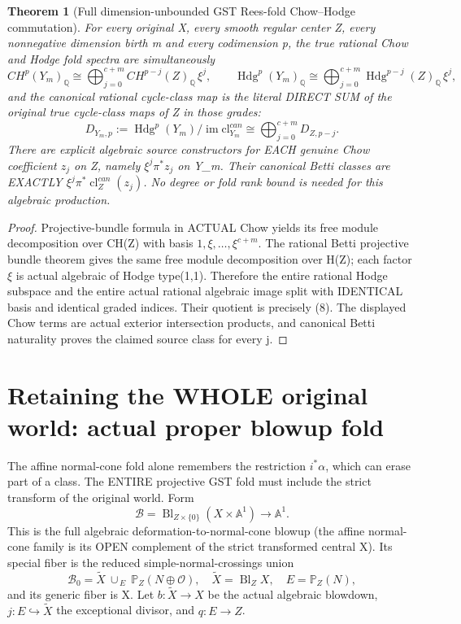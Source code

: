 \documentclass[11pt]{article}
\newtheorem{theorem}{Theorem}[section]
\begin{document}
\begin{theorem}[Full dimension-unbounded GST Rees-fold Chow--Hodge commutation]
For every original X, every smooth regular center Z,
every nonnegative dimension birth m and every codimension p,
the true rational Chow and Hodge fold spectra are
simultaneously
\[
 CH^p(Y_m)_\mathbb Q
 \cong\bigoplus_{j=0}^{c+m}
 CH^{p-j}(Z)_\mathbb Q\,\xi^j,
 \qquad
 \operatorname{Hdg}^p(Y_m)_\mathbb Q
 \cong\bigoplus_{j=0}^{c+m}
 \operatorname{Hdg}^{p-j}(Z)_\mathbb Q\,\xi^j,
                                                               \tag{7}
\]
and the canonical rational cycle-class map is the
literal DIRECT SUM of the original true cycle-class maps
of Z in those grades:
\[
 \boxed{
 D_{Y_m,p}:=\operatorname{Hdg}^p(Y_m)/
     \operatorname{im}\mathrm{cl}^{can}_{Y_m}
 \cong \bigoplus_{j=0}^{c+m}D_{Z,p-j}.
 }                                                       \tag{8}
\]
There are explicit algebraic source constructors for EACH
genuine Chow coefficient $z_j$ on Z,
namely $\xi^j\pi^*z_j$ on Y_m.
Their canonical Betti classes are EXACTLY
$\xi^j\pi^*\operatorname{cl}^{can}_Z(z_j)$.
No degree or fold rank bound is needed for this
algebraic production.
\end{theorem}
\begin{proof}
Projective-bundle formula in ACTUAL Chow yields its
free module decomposition over CH(Z) with basis
$1,\xi,\ldots,\xi^{c+m}$.
The rational Betti projective bundle theorem gives
the same free module decomposition over H(Z);
each factor $\xi$ is actual algebraic of Hodge type(1,1).
Therefore the entire rational Hodge subspace
and the entire actual rational algebraic image split
with IDENTICAL basis and identical graded indices.
Their quotient is precisely (8). The displayed
Chow terms are actual exterior intersection products,
and canonical Betti naturality proves the claimed
source class for every j.
\end{proof}

\section{Retaining the WHOLE original world: actual proper blowup fold}
The affine normal-cone fold alone remembers
the restriction $i^*\alpha$, which can erase
part of a class. The ENTIRE projective GST fold
must include the strict transform of the original
world. Form
\[
 \boxed{
 \mathscr B=
 \operatorname{Bl}_{Z\times\{0\}}(X\times\mathbb A^1)
       \to\mathbb A^1.
 }                                                       \tag{9}
\]
This is the full algebraic deformation-to-normal-cone
blowup (the affine normal-cone family is its OPEN
complement of the strict transformed central X). Its special fiber is the reduced
simple-normal-crossings union
\[
 \boxed{
 \mathscr B_0=
 \widetilde X\ \cup_{\,E}\ \mathbb P_Z(N\oplus\mathcal O),
 \quad
 \widetilde X=\operatorname{Bl}_{Z}X,\quad
 E=\mathbb P_Z(N),
 }                                                       \tag{10}
\]
and its generic fiber is X.
Let $b:\widetilde X\to X$ be the actual algebraic
blowdown, $j:E\hookrightarrow\widetilde X$
the exceptional divisor, and $q:E\to Z$.
\end{document}
